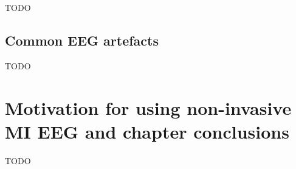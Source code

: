 TODO


\subsection{Common EEG artefacts}
\label{subsec:biomedical_signals_working_with_eeg_artefacts}


TODO


\section{Motivation for using non-invasive MI EEG and chapter conclusions}
\label{sec:biomedical_signals_summary}



TODO